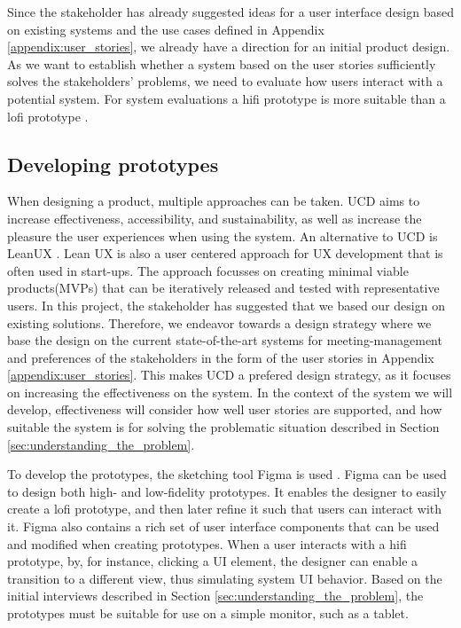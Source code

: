 Since the stakeholder has already suggested ideas for a user interface design based on existing systems and the use cases defined in Appendix \ref{appendix:user_stories}, we already have a direction for an initial product design. 
As we want to establish whether a system based on the user stories sufficiently solves the stakeholders' problems, we need to evaluate how users interact with a potential system.
For system evaluations a hifi prototype is more suitable than a lofi prototype \cite{low-vs-high-fidelity-prototype}.

\subsection{Developing prototypes}
When designing a product, multiple approaches can be taken.  
UCD aims to increase effectiveness, accessibility, and sustainability, as well as increase the pleasure the user experiences when using the system\cite{user-centred-design}. 
An alternative to UCD is LeanUX \cite{Lean_UX}.
Lean UX is also a user centered approach for UX development that is often used in start-ups.
The approach focusses on creating minimal viable products(MVPs) that can be iteratively released and tested with representative users. 
In this project, the stakeholder has suggested that we based our design on existing solutions.
Therefore, we endeavor towards a design strategy where we base the design on the current state-of-the-art systems for meeting-management and preferences of the stakeholders in the form of the user stories in Appendix \ref{appendix:user_stories}.
This makes UCD a prefered design strategy, as it focuses on increasing the effectiveness on the system.
In the context of the system we will develop, effectiveness will consider how well user stories are supported, and how suitable the system is for solving the problematic situation described in Section \ref{sec:understanding_the_problem}.

To develop the prototypes, the sketching tool Figma is used \cite{Figma}.
Figma can be used to design both high- and low-fidelity prototypes. 
It enables the designer to easily create a lofi prototype, and then later refine it such that users can interact with it.
Figma also contains a rich set of user interface components that can be used and modified when creating prototypes.
When a user interacts with a hifi prototype, by, for instance, clicking a UI element, the designer can enable a transition to a different view, thus simulating system UI behavior.
Based on the initial interviews described in Section \ref{sec:understanding_the_problem}, the prototypes must be suitable for use on a simple monitor, such as a tablet.

